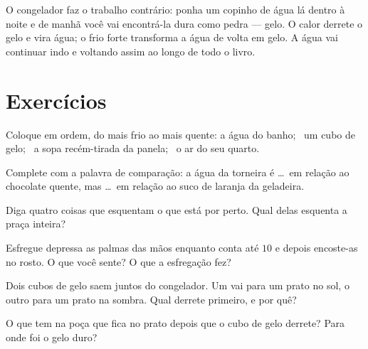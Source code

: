 \begin{example}\label{ex:g1:hot-and-cold:freezer}
O congelador faz o trabalho contrário: ponha um copinho de água lá
dentro à noite e de manhã você vai encontrá-la dura como pedra ---
gelo. O calor derrete o gelo e vira água; o frio forte transforma a
água de volta em gelo. A água vai continuar indo e voltando assim ao
longo de todo o livro.
\end{example}

\section{Exercícios}

\begin{exercise}[$\star$]\label{exo:g1:hot-and-cold:1}
Coloque em ordem, do mais frio ao mais quente: a água do banho; \ um
cubo de gelo; \ a sopa recém-tirada da panela; \ o ar do seu quarto.
\end{exercise}

\begin{exercise}[$\star$]\label{exo:g1:hot-and-cold:2}
Complete com a palavra de comparação: a água da torneira é \dots\ em
relação ao chocolate quente, mas \dots\ em relação ao suco de laranja
da geladeira.
\end{exercise}

\begin{exercise}[$\star$]\label{exo:g1:hot-and-cold:3}
Diga quatro coisas que esquentam o que está por perto. Qual delas
esquenta a praça inteira?
\end{exercise}

\begin{exercise}[$\star$]\label{exo:g1:hot-and-cold:4}
Esfregue depressa as palmas das mãos enquanto conta até $10$ e depois
encoste-as no rosto. O que você sente? O que a esfregação fez?
\end{exercise}

\begin{exercise}[$\star$]\label{exo:g1:hot-and-cold:5}
Dois cubos de gelo saem juntos do congelador. Um vai para um prato no
sol, o outro para um prato na sombra. Qual derrete primeiro, e por
quê?
\end{exercise}

\begin{exercise}[$\star$]\label{exo:g1:hot-and-cold:6}
O que tem na poça que fica no prato depois que o cubo de gelo
derrete? Para onde foi o gelo duro?
\end{exercise}

